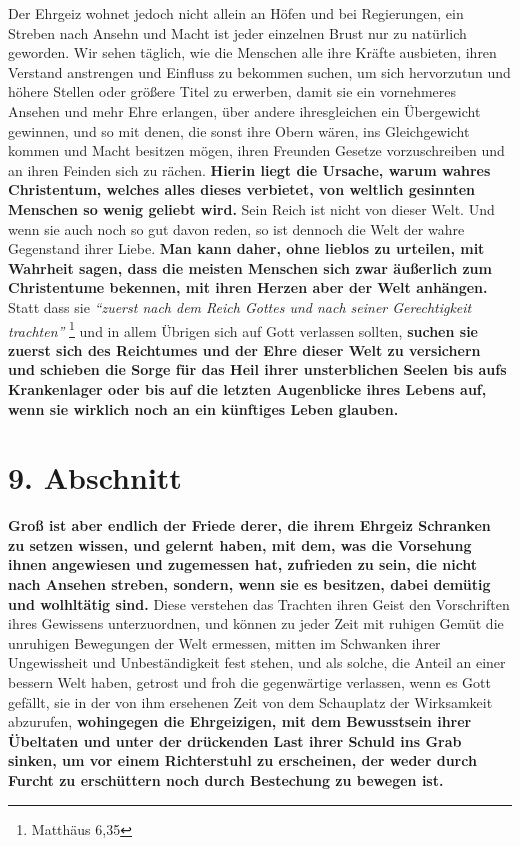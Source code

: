 Der Ehrgeiz wohnet jedoch nicht allein an Höfen und bei Regierungen, ein Streben
nach Ansehn und Macht ist jeder einzelnen Brust nur zu natürlich geworden. Wir
sehen täglich, wie die Menschen alle ihre Kräfte ausbieten, ihren Verstand
anstrengen und Einfluss zu bekommen suchen, um sich hervorzutun und höhere
Stellen oder größere Titel zu erwerben, damit sie ein vornehmeres Ansehen und
mehr Ehre erlangen, über andere ihresgleichen ein Übergewicht gewinnen, und so
mit denen, die sonst ihre Obern wären, ins Gleichgewicht kommen und Macht
besitzen mögen, ihren Freunden Gesetze vorzuschreiben und an ihren Feinden sich
zu rächen.
\label{ref:08_08_reich_gottes} \textbf{Hierin liegt die Ursache, warum wahres
Christentum, welches alles
dieses verbietet, von weltlich gesinnten Menschen so wenig geliebt wird.} Sein
Reich ist nicht von dieser Welt.
Und wenn sie auch noch so gut davon reden, so
ist dennoch die Welt der wahre Gegenstand ihrer Liebe. \textbf{Man kann daher,
ohne
lieblos zu urteilen, mit Wahrheit sagen, dass die meisten Menschen sich zwar
äußerlich zum Christentume bekennen, mit ihren Herzen aber der
Welt anhängen.}
Statt dass sie
\textit{"`zuerst nach dem Reich Gottes und nach seiner Gerechtigkeit
trachten"'}
\footnote{Matthäus 6,35}
und in allem Übrigen sich auf Gott verlassen
sollten, \textbf{suchen sie zuerst sich des Reichtumes und der Ehre dieser Welt
zu
versichern und schieben die Sorge für das Heil ihrer unsterblichen Seelen bis
aufs Krankenlager oder bis auf die letzten Augenblicke ihres Lebens auf, wenn
sie wirklich noch an ein künftiges Leben glauben.}

\section{9. Abschnitt} \label{kap8_ab9}

\label{ref:08_09_friedem} \textbf{Groß ist aber endlich der Friede derer,
die ihrem Ehrgeiz Schranken zu setzen wissen, und gelernt haben, mit dem, was
die Vorsehung ihnen angewiesen und
zugemessen hat, zufrieden zu sein,
die nicht nach Ansehen streben, sondern, wenn
sie es besitzen, dabei demütig und wolhltätig sind.} Diese verstehen das
Trachten ihren Geist den Vorschriften ihres Gewissens unterzuordnen, und
können zu jeder Zeit mit ruhigen Gemüt die unruhigen Bewegungen der Welt
ermessen, mitten im Schwanken ihrer Ungewissheit und Unbeständigkeit fest
stehen,
und als solche, die Anteil an einer bessern Welt haben, getrost und froh die
gegenwärtige verlassen, wenn es Gott gefällt, sie in der von ihm
ersehenen Zeit
von dem Schauplatz der Wirksamkeit abzurufen, \textbf{wohingegen die
Ehrgeizigen, mit
dem Bewusstsein ihrer Übeltaten und unter der drückenden Last ihrer
Schuld ins
Grab sinken, um vor einem Richterstuhl  zu erscheinen,
der weder durch Furcht zu
erschüttern noch durch Bestechung zu bewegen ist.}

